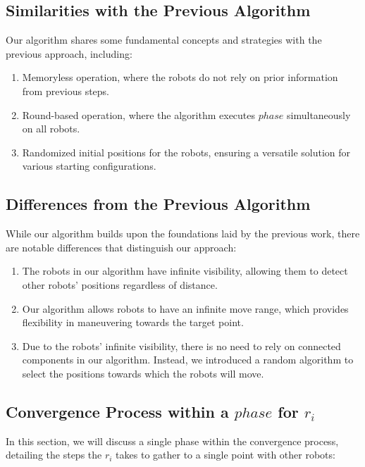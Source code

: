 \documentclass[]{report}
\begin{document}
\subsection{Similarities with the Previous Algorithm}

Our algorithm shares some fundamental concepts and strategies with the previous approach, including:
\begin{enumerate}
\item Memoryless operation, where the robots do not rely on prior information from previous steps.
\item Round-based operation, where the algorithm executes \(phase\) simultaneously on all robots. 
\item Randomized initial positions for the robots, ensuring a versatile solution for various starting configurations.
\end{enumerate}
\subsection{Differences from the Previous Algorithm}

While our algorithm builds upon the foundations laid by the previous work, there are notable differences that distinguish our approach:
\begin{enumerate}
\item The robots in our algorithm have infinite visibility, allowing them to detect other robots' positions regardless of distance.
\item Our algorithm allows robots to have an infinite move range, which provides flexibility in maneuvering towards the target point.
\item Due to the robots' infinite visibility, there is no need to rely on connected components in our algorithm. Instead, we introduced a random algorithm to select the positions towards which the robots will move.
\end{enumerate}

\subsection{Convergence Process within a \(phase\) for \(r_i\)}

In this section, we will discuss a single phase within the convergence process, detailing the steps the \(r_i\) takes to gather to a single point with other robots:
\end{document}
